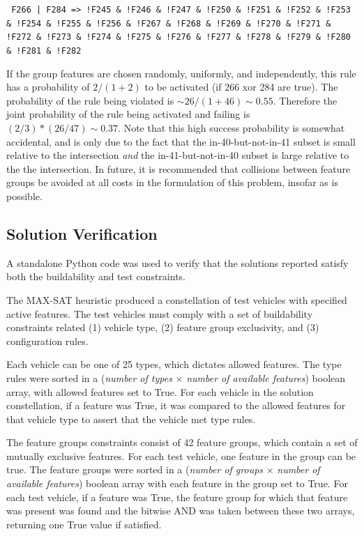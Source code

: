 \documentclass[aps,pra,twocolumn,superscriptaddress,groupedaddress]{revtex4}  %
\begin{document}
\texttt{ F266 | F284 => !F245 \& !F246 \& !F247 \& !F250 \& !F251 \& !F252 \& !F253 \&
!F254 \& !F255 \& !F256 \& !F267 \& !F268 \& !F269 \& !F270 \& !F271 \& !F272 \& !F273 \&
!F274 \& !F275 \& !F276 \& !F277 \& !F278 \& !F279 \& !F280 \& !F281 \& !F282}

If the group features are chosen randomly, uniformly, and independently, this
rule has a probability of $2/(1+2)$ to be activated (if 266 xor 284 are true).
The probability of the rule being violated is $\sim 26/(1+46) \sim 0.55$.
Therefore the joint probability of the rule being activated and failing is
$(2/3) * (26/47) \sim 0.37$. Note that this high success probability is somewhat
accidental, and is only due to the fact that the in-40-but-not-in-41 subset is
small relative to the intersection \emph{and} the in-41-but-not-in-40 subset is
large relative to the the intersection. In future, it is recommended that
collisions between feature groups be avoided at all costs in the formulation of
this problem, insofar as is possible.

\subsection{Solution Verification}

A standalone Python code was used to verify that the solutions reported satisfy
both the buildability and test constraints.

The MAX-SAT heuristic produced a constellation of test vehicles with specified
active features. The test vehicles must comply with a set of buildability
constraints related (1) vehicle type, (2) feature group exclusivity, and
(3) configuration rules.

Each vehicle can be one of 25 types, which dictates allowed features. 
The type rules were sorted in a (\textit{number of types} $\times$
\textit{number of available features}) boolean array, with allowed features set
to True. For each vehicle in the solution constellation, if a feature was True,
it was compared to the allowed features for that vehicle type to assert that the
vehicle met type rules.

The feature groups constraints consist of 42 feature groups, which contain a set
of mutually exclusive features. For each test vehicle, one feature in the group can
be true. The feature groups were sorted in a (\textit{number of groups} $\times$
\textit{number of available features}) boolean array with each feature in the group
set to True. For each test vehicle, if a feature was True, the feature group for
which that feature was present was found and the bitwise AND was taken between
these two arrays, returning one True value if satisfied.
\end{document}
